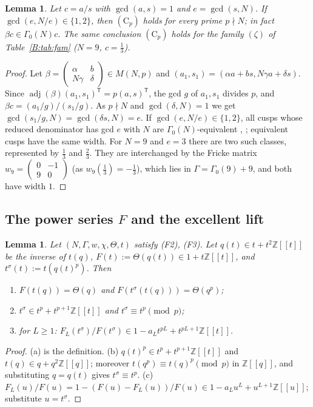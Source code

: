 \documentclass[11pt,a4paper]{article}
\newtheorem{lemma}[theorem]{Lemma}
\theoremstyle{definition}\newtheorem{definition}[theorem]{Definition}
\theoremstyle{remark}\newtheorem{remark}[theorem]{Remark}
\newcommand{\Z}{\mathbb Z}
\DeclareMathOperator{\adj}{adj}
\newcommand{\bmat}[4]{\left(\begin{smallmatrix}#1&#2\\#3&#4\end{smallmatrix}\right)}
\numberwithin{equation}{section}
\begin{document}
\begin{lemma}\label{B:lem:Cp}
Let $c=a/s$ with $\gcd(a,s)=1$ and $e=\gcd(s,N)$. If $\gcd(e,N/e)\in\{1,2\}$, then $(\mathrm C_p)$
holds for every prime $p\nmid N$; in fact $\beta c\in\Gamma_0(N)c$. The same conclusion
$(\mathrm C_p)$ holds for the family $(\zeta)$ of Table~\ref{B:tab:fam} ($N=9$, $c=\frac13$).
\end{lemma}
\begin{proof}
Let $\beta=\bmat\alpha b{N\gamma}\delta\in M(N,p)$ and $(a_1,s_1)=(\alpha a+bs,N\gamma a+\delta s)$.
Since $\adj(\beta)(a_1,s_1)^{\mathsf T}=p(a,s)^{\mathsf T}$, the gcd $g$ of $a_1,s_1$ divides $p$,
and $\beta c=(a_1/g)/(s_1/g)$. As $p\nmid N$ and $\gcd(\delta,N)=1$ we get
$\gcd(s_1/g,N)=\gcd(\delta s,N)=e$. If $\gcd(e,N/e)\in\{1,2\}$, all cusps whose reduced denominator
has gcd $e$ with $N$ are $\Gamma_0(N)$-equivalent \cite[Prop.~3.8.3]{DS05},
\cite[Lemma~3.5]{Beu26}; equivalent cusps have the same width. For $N=9$ and $e=3$ there are two
such classes, represented by $\frac13$ and $\frac23$. They are interchanged by the Fricke matrix
$w_9=\bmat0{-1}90$ (as $w_9(\frac13)=-\frac13$), which lies in $\Gamma=\Gamma_0(9)+9$, and both have
width $1$.
\end{proof}

\subsection{\texorpdfstring{The power series $F$ and the excellent lift}{The power series F and the excellent lift}}
\begin{lemma}\label{B:lem:Ft}
Let $(N,\Gamma,w,\chi,\Theta,t)$ satisfy \textup{(F2)}, \textup{(F3)}. Let $q(t)\in t+t^2\Z[[t]]$ be
the inverse of $t(q)$, $F(t):=\Theta(q(t))\in1+t\Z[[t]]$, and $t^\sigma(t):=t(q(t)^p)$. Then
\begin{enumerate}[label=\textup{(\alph*)}]
\item $F(t(q))=\Theta(q)$ and $F(t^\sigma(t(q)))=\Theta(q^p)$;
\item $t^\sigma\in t^p+t^{p+1}\Z[[t]]$ and $t^\sigma\equiv t^p\pmod p$;
\item for $L\ge1$: $F_L(t^\sigma)/F(t^\sigma)\in1-a_Lt^{pL}+t^{pL+1}\Z[[t]]$.
\end{enumerate}
\end{lemma}
\begin{proof}
(a) is the definition. (b) $q(t)^p\in t^p+t^{p+1}\Z[[t]]$ and $t(q)\in q+q^2\Z[[q]]$; moreover
$t(q^p)\equiv t(q)^p\pmod p$ in $\Z[[q]]$, and substituting $q=q(t)$ gives $t^\sigma\equiv t^p$.
(c) $F_L(u)/F(u)=1-(F(u)-F_L(u))/F(u)\in1-a_Lu^L+u^{L+1}\Z[[u]]$; substitute $u=t^\sigma$.
\end{proof}
\end{document}
